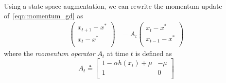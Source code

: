 \documentclass{article}
\newcommand{\mat}[1]{\bm{\mathit{#1}}}
\begin{document}
Using a state-space augmentation, we can rewrite the momentum update of~\eqref{eqn:momentum_gd} as
\begin{equation}
\begin{aligned}
{\begin{pmatrix}
x_{t+1} - x^*\\
x_t - x^* \\
\end{pmatrix}}
&= \mat{A}_t
{\begin{pmatrix}
x_t - x^* \\
x_{t-1} - x^*\\
\end{pmatrix}} %
\label{equ:one_dim_22_rec}
\end{aligned}
\end{equation}
where the {\em momentum operator} $\mat{A}_t$ at time $t$ is defined as
\begin{equation}
	\mat{A}_t \triangleq {\begin{bmatrix}
	1-\alpha h(x_t) + \mu & - \mu \\
	1 & 0 \\
	\end{bmatrix}}
\end{equation}
\end{document}
